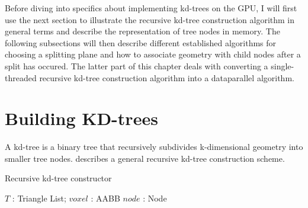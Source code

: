 Before diving into specifics about implementing kd-trees on the GPU, I will
first use the next section to illustrate the recursive kd-tree construction
algorithm in general terms and describe the representation of tree nodes in
memory. The following subsections will then describe different established
algorithms for choosing a splitting plane and how to associate geometry with
child nodes after a split has occured. The latter part of this chapter deals
with converting a single-threaded recursive kd-tree construction algorithm into
a dataparallel algorithm.



\section{Building KD-trees}\label{sec:buildingTrees}

A kd-tree is a binary tree that recursively subdivides k-dimensional geometry
into smaller tree nodes.  describes a general
recursive kd-tree construction scheme.

\begin{algorithm}
  \caption{Recursive kd-tree constructor}
  \label{alg:kdTreeCreator}
  \begin{algorithmic}
              {$T$ : Triangle List; $voxel$ : AABB}
              {$node$ : Node}
              {
                \ELSE
                \ENDIF}
  \end{algorithmic}
\end{algorithm}


